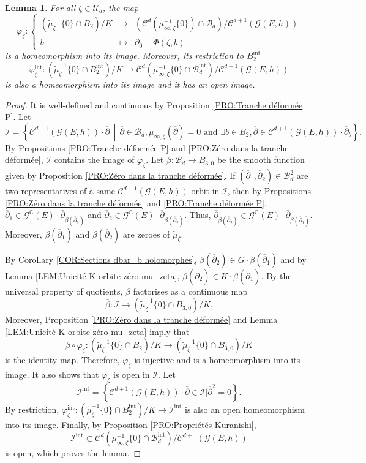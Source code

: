 \documentclass{article}
\newtheorem{lemma}[theorem]{Lemma}
\theoremstyle{remark}
\theoremstyle{definition}
\newcommand{\C}{\mathbb{C}}
\newcommand{\G}{\mathcal{G}}
\newcommand{\mB}{\mathcal{B}}
\newcommand{\mC}{\mathcal{C}}
\newcommand{\mU}{\mathcal{U}}
\newcommand{\dbar}{\overline{\partial}}
\newcommand{\fonction}[4]{\left\{ \begin{array}{rcl}
		\displaystyle #1 & \longrightarrow & \displaystyle #2\\
		\displaystyle #3 & \longmapsto & \displaystyle #4
	\end{array} \right.}
\begin{document}
\begin{lemma}\label{LEM:Lemme Kempf--Ness P}
    For all $\zeta \in \mU_d$, the map
    $$
    \varphi_\zeta : \fonction{(\tilde{\mu}_\zeta^{-1}\{0\} \cap B_2)/K}{(\mC^d(\mu_{\infty,\zeta}^{-1}\{0\}) \cap \mB_d)/\mC^{d + 1}(\G(E,h))}{b}{\dbar_0 + \tilde{\Phi}(\zeta,b)}
    $$
    is a homeomorphism into its image. Moreover, its restriction to $B_2^{\mathrm{int}}$
    $$
    \varphi_\zeta^{\mathrm{int}} : (\tilde{\mu}_\zeta^{-1}\{0\} \cap B_2^{\mathrm{int}})/K \longrightarrow \mC^d(\mu_{\infty,\zeta}^{-1}\{0\} \cap \mB_d^{\mathrm{int}})/\mC^{d + 1}(\G(E,h))
    $$
    is also a homeomorphism into its image and it has an open image.
\end{lemma}
\begin{proof}
It is well-defined and continuous by Proposition \ref{PRO:Tranche déformée P}. Let
$$
\mathcal{I} = \left\{\mC^{d + 1}(\G(E,h)) \cdot \dbar\,\middle|\,\dbar \in \mB_d, \mu_{\infty,\zeta}(\dbar) = 0 \textrm{ and } \exists b \in B_2, \dbar \in \mC^{d + 1}(\G(E,h)) \cdot \dbar_b\right\}.
$$
By Propositions \ref{PRO:Tranche déformée P} and \ref{PRO:Zéro dans la tranche déformée}, $\mathcal{I}$ contains the image of $\varphi_\zeta$. Let $\beta : \mB_d \rightarrow B_{3,0}$ be the smooth function given by Proposition \ref{PRO:Zéro dans la tranche déformée}. If $(\dbar_1,\dbar_2) \in \mB_d^2$ are two representatives of a same $\mC^{d + 1}(\G(E,h))$-orbit in $\mathcal{I}$, then by Propositions \ref{PRO:Zéro dans la tranche déformée} and \ref{PRO:Tranche déformée P}, $\dbar_1 \in \G^\C(E) \cdot \dbar_{\beta(\dbar_1)}$ and $\dbar_2 \in \G^\C(E) \cdot \dbar_{\beta(\dbar_2)}$. Thus, $\dbar_{\beta(\dbar_2)} \in \G^\C(E) \cdot \dbar_{\beta(\dbar_1)}$. Moreover, $\beta(\dbar_1)$ and $\beta(\dbar_2)$ are zeroes of $\tilde{\mu}_\zeta$.

By Corollary \ref{COR:Sections dbar_b holomorphes}, $\beta(\dbar_2) \in G \cdot \beta(\dbar_1)$ and by Lemma \ref{LEM:Unicité K-orbite zéro mu_zeta}, $\beta(\dbar_2) \in K \cdot \beta(\dbar_1)$. By the universal property of quotients, $\beta$ factorises as a continuous map
$$
\overline{\beta} : \mathcal{I} \longrightarrow (\tilde{\mu}_\zeta^{-1}\{0\} \cap B_{3,0})/K.
$$
Moreover, Proposition \ref{PRO:Zéro dans la tranche déformée} and Lemma \ref{LEM:Unicité K-orbite zéro mu_zeta} imply that
$$
\overline{\beta} \circ \varphi_\zeta : (\tilde{\mu}_\zeta^{-1}\{0\} \cap B_2)/K \longrightarrow (\tilde{\mu}_\zeta^{-1}\{0\} \cap B_{3,0})/K
$$
is the identity map. Therefore, $\varphi_\zeta$ is injective and is a homeomorphism into its image. It also shows that $\varphi_\zeta$ is open in $\mathcal{I}$. Let
$$
\mathcal{I}^{\mathrm{int}} = \left\{\mC^{d + 1}(\G(E,h)) \cdot \dbar \in \mathcal{I}|\dbar^2 = 0\right\}.
$$
By restriction, $\varphi_\zeta^{\mathrm{int}} : (\tilde{\mu}_\zeta^{-1}\{0\} \cap B_2^{\mathrm{int}})/K \rightarrow \mathcal{I}^{\mathrm{int}}$ is also an open homeomorphism into its image. Finally, by Proposition \ref{PRO:Propriétés Kuranishi},
$$
\mathcal{I}^{\mathrm{int}} \subset \mC^d(\mu_{\infty,\zeta}^{-1}\{0\} \cap \mB_d^{\mathrm{int}})/\mC^{d + 1}(\G(E,h))
$$
is open, which proves the lemma.
\end{proof}
\end{document}
